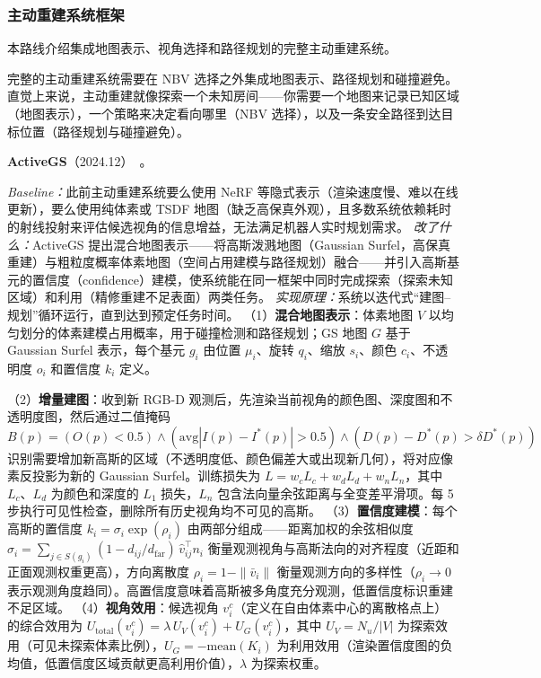 \subsubsection{主动重建系统框架}

本路线介绍集成地图表示、视角选择和路径规划的完整主动重建系统。

完整的主动重建系统需要在 NBV 选择之外集成地图表示、路径规划和碰撞避免。直觉上来说，主动重建就像探索一个未知房间——你需要一个地图来记录已知区域（地图表示），一个策略来决定看向哪里（NBV 选择），以及一条安全路径到达目标位置（路径规划与碰撞避免）。

\textbf{ActiveGS}（2024.12）~\cite{2412_17769}。

\emph{Baseline：}此前主动重建系统要么使用 NeRF 等隐式表示（渲染速度慢、难以在线更新），要么使用纯体素或 TSDF 地图（缺乏高保真外观），且多数系统依赖耗时的射线投射来评估候选视角的信息增益，无法满足机器人实时规划需求。
\emph{改了什么：}ActiveGS 提出混合地图表示——将高斯泼溅地图（Gaussian Surfel，高保真重建）与粗粒度概率体素地图（空间占用建模与路径规划）融合——并引入高斯基元的置信度（confidence）建模，使系统能在同一框架中同时完成探索（探索未知区域）和利用（精修重建不足表面）两类任务。
\emph{实现原理：}系统以迭代式``建图--规划''循环运行，直到达到预定任务时间。%
（1）\textbf{混合地图表示}：体素地图 $V$ 以均匀划分的体素建模占用概率，用于碰撞检测和路径规划；GS 地图 $G$ 基于 Gaussian Surfel 表示，每个基元 $g_i$ 由位置 $\mu_i$、旋转 $q_i$、缩放 $s_i$、颜色 $c_i$、不透明度 $o_i$ 和置信度 $k_i$ 定义。

%
（2）\textbf{增量建图}：收到新 RGB-D 观测后，先渲染当前视角的颜色图、深度图和不透明度图，然后通过二值掩码 $B(p)=(O(p)<0.5)\wedge(\mathrm{avg}|I(p)-I^*(p)|>0.5)\wedge(D(p)-D^*(p)>\delta D^*(p))$ 识别需要增加新高斯的区域（不透明度低、颜色偏差大或出现新几何），将对应像素反投影为新的 Gaussian Surfel。训练损失为 $L = w_c L_c + w_d L_d + w_n L_n$，其中 $L_c$、$L_d$ 为颜色和深度的 $L_1$ 损失，$L_n$ 包含法向量余弦距离与全变差平滑项。每 5 步执行可见性检查，删除所有历史视角均不可见的高斯。%
（3）\textbf{置信度建模}：每个高斯的置信度 $k_i = \sigma_i \exp(\rho_i)$ 由两部分组成——距离加权的余弦相似度 $\sigma_i = \sum_{j \in S(g_i)}(1 - d_{ij}/d_{\mathrm{far}})\,\hat{v}_{ij}^{\top}n_i$ 衡量观测视角与高斯法向的对齐程度（近距和正面观测权重更高），方向离散度 $\rho_i = 1 - \|\bar{v}_i\|$ 衡量观测方向的多样性（$\rho_i \to 0$ 表示观测角度趋同）。高置信度意味着高斯被多角度充分观测，低置信度标识重建不足区域。%
（4）\textbf{视角效用}：候选视角 $v_i^c$（定义在自由体素中心的离散格点上）的综合效用为 $U_{\mathrm{total}}(v_i^c) = \lambda\,U_V(v_i^c) + U_G(v_i^c)$，其中 $U_V = N_u / |V|$ 为探索效用（可见未探索体素比例），$U_G = -\mathrm{mean}(K_i)$ 为利用效用（渲染置信度图的负均值，低置信度区域贡献更高利用价值），$\lambda$ 为探索权重。

